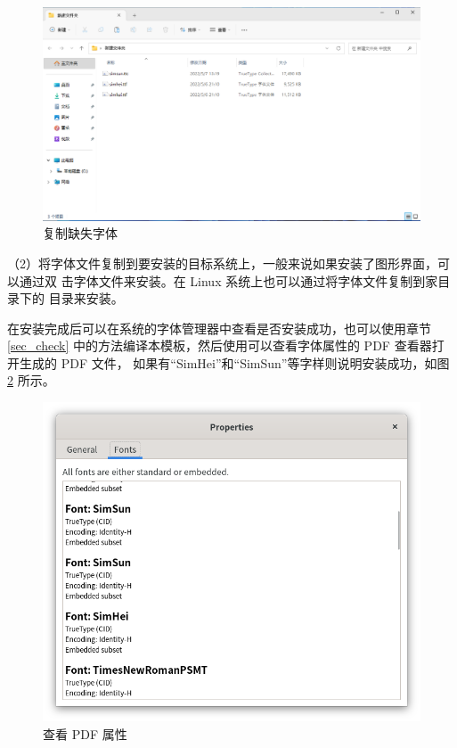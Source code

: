 \begin{figure}[htbp]
	\centering
	\includegraphics[width=\linewidth]{figure/thesis/copy_fonts.png}
	\caption{复制缺失字体}
	\label{fig:copy_fonts}
\end{figure}

（2）将字体文件复制到要安装的目标系统上，一般来说如果安装了图形界面，可以通过双
击字体文件来安装。在 Linux 系统上也可以通过将字体文件复制到家目录下的
 目录来安装。

在安装完成后可以在系统的字体管理器中查看是否安装成功，也可以使用章节 \ref{sec_check}
中的方法编译本模板，然后使用可以查看字体属性的 PDF 查看器打开生成的 PDF 文件，
如果有“SimHei”和“SimSun”等字样则说明安装成功，如图 \ref{fig:pdf_properties} 所示。

\begin{figure}[htbp]
	\centering
	\includegraphics[width=\linewidth]{figure/thesis/pdf_properties.png}
	\caption{查看 PDF 属性}
	\label{fig:pdf_properties}
\end{figure}

